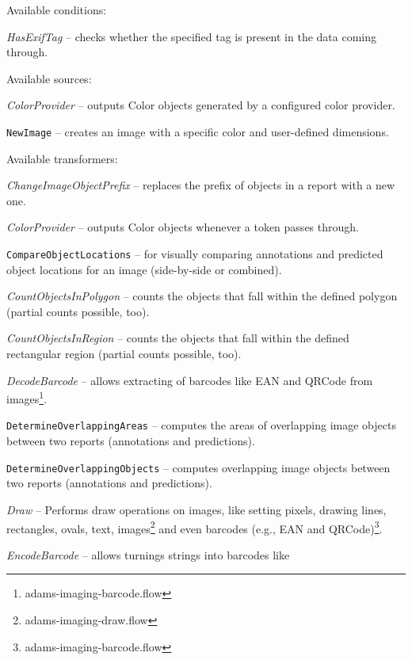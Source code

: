 \documentclass[a4paper]{book}
\begin{document}
\noindent Available conditions:
\begin{tight_itemize}
  \item \textit{HasExifTag} -- checks whether the specified tag is present in
  the data coming through.
\end{tight_itemize}

\noindent Available sources:
\begin{tight_itemize}
  \item \textit{ColorProvider} -- outputs Color objects generated by a
  configured color provider.
  \item \texttt{NewImage} -- creates an image with a specific color and
  user-defined dimensions.
\end{tight_itemize}

\noindent Available transformers:
\begin{tight_itemize}
  \item \textit{ChangeImageObjectPrefix} -- replaces the prefix of
  objects in a report with a new one.
  \item \textit{ColorProvider} -- outputs Color objects whenever a token
  passes through.
  \item \texttt{CompareObjectLocations} -- for visually comparing annotations
  and predicted object locations for an image (side-by-side or combined).
  \item \textit{CountObjectsInPolygon} -- counts the objects that fall
  within the defined polygon (partial counts possible, too).
  \item \textit{CountObjectsInRegion} -- counts the objects that fall
  within the defined rectangular region (partial counts possible, too).
  \item \textit{DecodeBarcode} -- allows extracting of barcodes like
  EAN and QRCode from images\footnote{adams-imaging-barcode.flow}.
  \item \texttt{DetermineOverlappingAreas} -- computes the areas of overlapping image objects
  between two reports (annotations and predictions).
  \item \texttt{DetermineOverlappingObjects} -- computes overlapping image objects
  between two reports (annotations and predictions).
  \item \textit{Draw} -- Performs draw operations on images, like setting
  pixels, drawing lines, rectangles, ovals, text, images\footnote{adams-imaging-draw.flow}
  and even barcodes (e.g., EAN and QRCode)\footnote{adams-imaging-barcode.flow}.
  \item \textit{EncodeBarcode} -- allows turnings strings into barcodes like

\end{tight_itemize}
\end{document}
